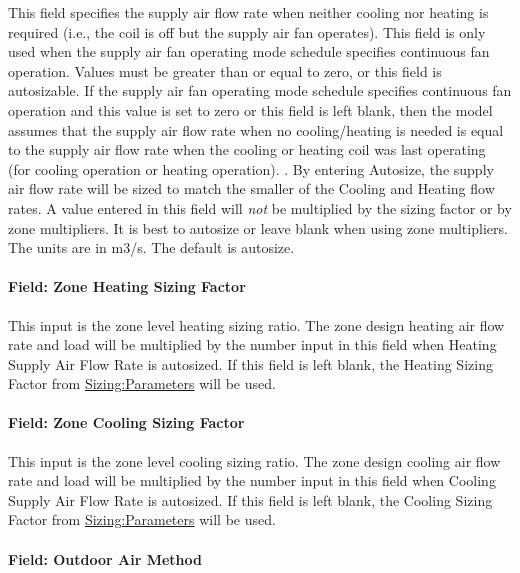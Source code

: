 This field specifies the supply air flow rate when neither cooling nor heating is required (i.e., the coil is off but the supply air fan operates). This field is only used when the supply air fan operating mode schedule specifies continuous fan operation. Values must be greater than or equal to zero, or this field is autosizable. If the supply air fan operating mode schedule specifies continuous fan operation and this value is set to zero or this field is left blank, then the model assumes that the supply air flow rate when no cooling/heating is needed is equal to the supply air flow rate when the cooling or heating coil was last operating (for cooling operation or heating operation). . By entering Autosize, the supply air flow rate will be sized to match the smaller of the Cooling and Heating flow rates. A value entered in this field will \emph{not} be multiplied by the sizing factor or by zone multipliers. It is best to autosize or leave blank when using zone multipliers. The units are in m3/s. The default is autosize.

\paragraph{Field: Zone Heating Sizing Factor}\label{field-zone-heating-sizing-factor-4}

This input is the zone level heating sizing ratio. The zone design heating air flow rate and load will be multiplied by the number input in this field when Heating Supply Air Flow Rate is autosized. If this field is left blank, the Heating Sizing Factor from \hyperref[sizingparameters]{Sizing:Parameters} will be used.

\paragraph{Field: Zone Cooling Sizing Factor}\label{field-zone-cooling-sizing-factor-3}

This input is the zone level cooling sizing ratio. The zone design cooling air flow rate and load will be multiplied by the number input in this field when Cooling Supply Air Flow Rate is autosized. If this field is left blank, the Cooling Sizing Factor from \hyperref[sizingparameters]{Sizing:Parameters} will be used.

\paragraph{Field: Outdoor Air Method}\label{field-outdoor-air-method-5}

